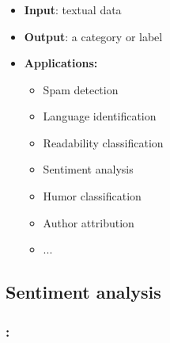 \documentclass[xcolor=table]{beamer}
\begin{document}
\begin{frame}
	\frametitle{\insertshortsubtitle}
	\framesubtitle{\insertsection}
	
	\begin{itemize}
		\item \textbf{Input}: textual data
		\item \textbf{Output}: a category or label
		\item \textbf{Applications:} 
		\begin{itemize}
			\item Spam detection
			\item Language identification
			\item Readability classification
			\item Sentiment analysis
			\item Humor classification
			\item Author attribution
			\item ...
		\end{itemize}
	\end{itemize}
	
\end{frame}


\subsection{Sentiment analysis}

\begin{frame}
	\frametitle{\insertshortsubtitle: \insertsection}
	\framesubtitle{\insertsubsection}
	
	
\end{frame}
\end{document}
